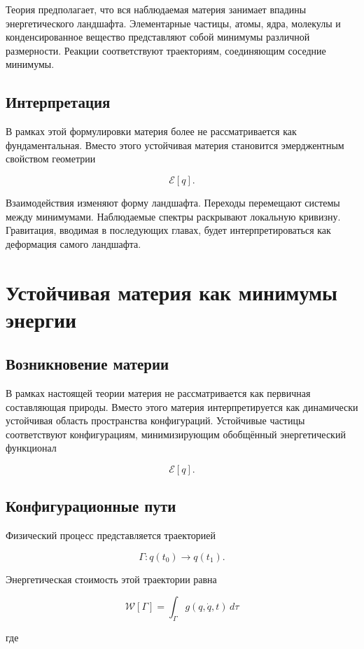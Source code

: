Теория предполагает, что вся наблюдаемая материя занимает впадины энергетического ландшафта. Элементарные частицы, атомы, ядра, молекулы и конденсированное вещество представляют собой минимумы различной размерности. Реакции соответствуют траекториям, соединяющим соседние минимумы.

\section{Интерпретация}

В рамках этой формулировки материя более не рассматривается как фундаментальная. Вместо этого устойчивая материя становится эмерджентным свойством геометрии

\[ \mathcal E[q]. \]

Взаимодействия изменяют форму ландшафта. Переходы перемещают системы между минимумами. Наблюдаемые спектры раскрывают локальную кривизну. Гравитация, вводимая в последующих главах, будет интерпретироваться как деформация самого ландшафта.

\chapter{Устойчивая материя как минимумы энергии}

\section{Возникновение материи}

В рамках настоящей теории материя не рассматривается как первичная составляющая природы. Вместо этого материя интерпретируется как динамически устойчивая область пространства конфигураций. Устойчивые частицы соответствуют конфигурациям, минимизирующим обобщённый энергетический функционал

\[ \mathcal E[q]. \]

\section{Конфигурационные пути}

Физический процесс представляется траекторией

\[ \Gamma : q(t_0) \rightarrow q(t_1). \]

Энергетическая стоимость этой траектории равна

\[ \boxed{ \mathcal W[\Gamma] = \int_\Gamma g(q,\dot q,t)\,d\tau } \]

где

